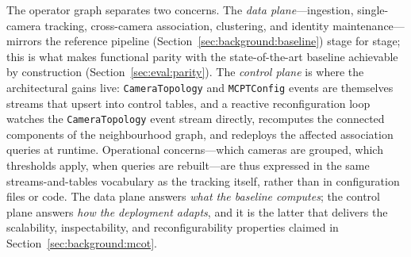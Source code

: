 \documentclass[review]{elsarticle}
\begin{document}
The operator graph separates two concerns. The \emph{data plane}---ingestion, single-camera
tracking, cross-camera association, clustering, and identity maintenance---mirrors the
reference pipeline (Section~\ref{sec:background:baseline}) stage for stage; this is what makes
functional parity with the state-of-the-art baseline achievable by construction
(Section~\ref{sec:eval:parity}). The \emph{control plane} is where the architectural gains
live: \texttt{CameraTopology} and \texttt{MCPTConfig} events are themselves streams that
upsert into control tables, and a reactive reconfiguration loop watches the
\texttt{CameraTopology} event stream directly, recomputes the connected components of the
neighbourhood graph, and redeploys the affected association queries at runtime. Operational
concerns---which cameras are grouped, which thresholds apply, when queries are rebuilt---are
thus expressed in the same streams-and-tables vocabulary as the tracking itself, rather than
in configuration files or code. The data plane
answers \emph{what the baseline computes}; the control plane answers \emph{how the deployment
adapts}, and it is the latter that delivers the scalability, inspectability, and
reconfigurability properties claimed in Section~\ref{sec:background:mcot}.
\end{document}
